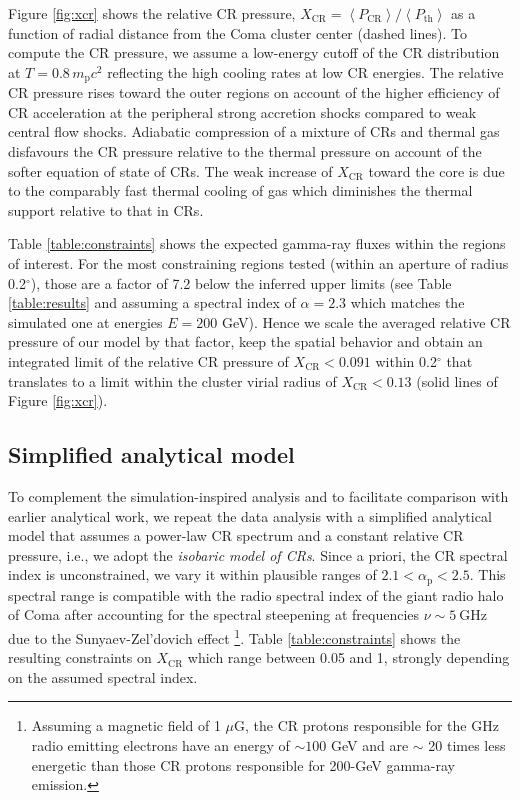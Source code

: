 \documentclass[12pt,manuscript]{aastex}
\newcommand{\expval}[1]{\left\langle #1 \right\rangle}
\newcommand{\rmn}{\mathrm}
\newcommand{\CR}{\mathrm{CR}}
\newcommand{\bra}{\langle}
\newcommand{\ket}{\rangle}
\begin{document}
Figure \ref{fig:xcr} shows the relative CR pressure, $X_{\CR} = \expval{P_{\CR}}/\expval{P_\rmn{th}}$ as a function of radial distance from the Coma cluster center (dashed lines). To compute the CR pressure, we assume a low-energy cutoff of the CR distribution at $T = 0.8\,m_\rmn{p} c^2$ reflecting the high cooling rates at low CR energies. The relative CR pressure rises toward the outer regions on account of the higher efficiency of CR acceleration at the peripheral strong accretion shocks compared to weak central flow shocks. Adiabatic compression of a mixture of CRs and thermal gas disfavours the CR pressure relative to the thermal pressure on account of the softer equation of state of CRs. The weak increase of $X_{\CR}$ toward the core is due to the comparably fast thermal cooling of gas which diminishes the thermal support relative to that in CRs.

Table \ref{table:constraints} shows the expected gamma-ray fluxes within the regions of interest. For the most constraining regions tested (within an aperture of radius 0.2$^{\circ}$), those are a factor of 7.2 below the inferred upper limits (see Table \ref{table:results} and assuming a spectral index of $\alpha=2.3$ which matches the simulated one at energies $E=200$ GeV). Hence we scale the averaged relative CR pressure %
of our model by that factor, keep the spatial behavior and obtain an integrated limit of the relative CR pressure of $X_{\CR}<0.091$ within 0.2$^{\circ}$ that translates to a limit within the cluster virial radius of $X_\CR<0.13$ (solid lines of Figure \ref{fig:xcr}).

\subsection{Simplified analytical model}
To complement the simulation-inspired analysis and to facilitate comparison with earlier analytical work, we repeat the data analysis with a simplified analytical model that assumes a power-law CR spectrum and a constant relative CR pressure, i.e., we adopt the {\em isobaric model of CRs}. Since a priori, the CR spectral index is unconstrained, we vary it within plausible ranges of $2.1<\alpha_{\rmn{p}}<2.5$. This spectral range is compatible with the radio spectral index of the giant radio halo of Coma after accounting for the spectral
steepening at frequencies $\nu\sim5~\rmn{GHz}$ due to the Sunyaev-Zel'dovich effect \citep{article:PfrommerEnsslin:2004b}\footnote{Assuming a magnetic field of 1 $\mu$G, the CR protons responsible for the GHz radio emitting electrons have an energy of $\sim100$ GeV and are $\sim$ 20 times less energetic than those CR protons responsible for 200-GeV gamma-ray emission.}. Table \ref{table:constraints} shows the resulting constraints on $X_\CR$ which range between 0.05 and 1, strongly
depending on the assumed spectral index.
\end{document}
